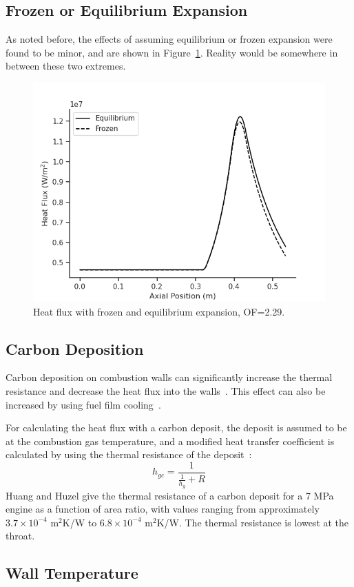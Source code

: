 \documentclass[11pt]{article}
\begin{document}
\subsection{Frozen or Equilibrium Expansion}
As noted before, the effects of assuming equilibrium or frozen expansion were found to be minor, and are shown in Figure~\ref{fig:equilibrium}. Reality would be somewhere in between these two extremes.

\begin{figure}[H]
  \centering
  \includegraphics[width=0.5\linewidth]{Equilibrium_Frozen.png}
  \caption{Heat flux with frozen and equilibrium expansion, OF=2.29.}
  \label{fig:equilibrium}
\end{figure}

\subsection{Carbon Deposition}

Carbon deposition on combustion walls can significantly increase the thermal resistance and decrease the heat flux into the walls~\cite[Page 86]{huang_modern_1992}. This effect can also be increased by using fuel film cooling~\cite[Page 35]{campbell_thrust_1963}.

For calculating the heat flux with a carbon deposit, the deposit is assumed to be at the combustion gas temperature, and a modified heat transfer coefficient is calculated by using the thermal resistance of the deposit~\cite{huang_modern_1992}:
\begin{equation}
  h_{gc} = \frac{1}{\frac{1}{h_g} + R}
\end{equation}
Huang and Huzel give the thermal resistance of a carbon deposit for a 7 MPa engine as a function of area ratio, with values ranging from approximately $3.7 \times 10^{-4}$ m$^2$K/W to $6.8 \times 10^{-4}$ m$^2$K/W. The thermal resistance is lowest at the throat.

\subsection{Wall Temperature}\label{sec:wall_temp}
\end{document}
